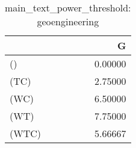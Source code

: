 \begin{table}
\centering
\caption{main_text_power_threshold: geoengineering}
\begin{tabular}{lr}
\toprule
{} &       G \\
\midrule
()    & 0.00000 \\
(TC)  & 2.75000 \\
(WC)  & 6.50000 \\
(WT)  & 7.75000 \\
(WTC) & 5.66667 \\
\bottomrule
\end{tabular}
\end{table}
